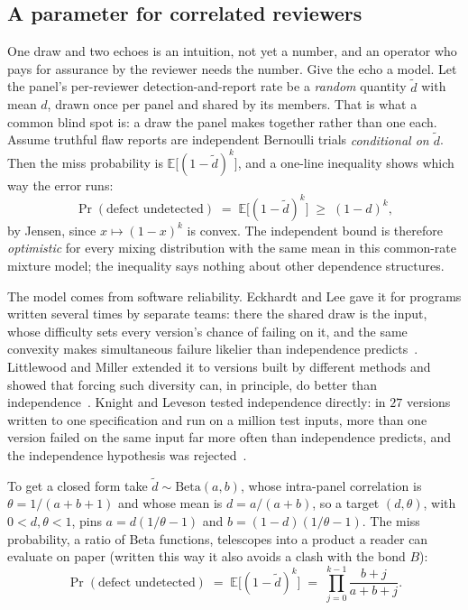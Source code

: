 \documentclass[11pt,a4paper]{article}
\theoremstyle{definition}
\theoremstyle{definition}
\theoremstyle{remark}
\begin{document}
\subsection{A parameter for correlated reviewers}\label{sec:assurance-correlation}

One draw and two echoes is an intuition, not yet a number, and an operator who
pays for assurance by the reviewer needs the number. Give the echo a
model. Let the panel's per-reviewer detection-and-report rate be a \emph{random} quantity $\tilde d$
with mean $d$, drawn once per panel and shared by its members. That is what a
common blind spot is: a draw the panel makes together rather than one each.
Assume truthful flaw reports are independent Bernoulli trials \emph{conditional on $\tilde d$}. Then
the miss probability is $\mathbb{E}\bigl[(1-\tilde d)^k\bigr]$, and a one-line
inequality shows which way the error runs:
\begin{equation}\label{eq:assurance-jensen}
\Pr(\text{defect undetected}) \;=\; \mathbb{E}\bigl[(1-\tilde d)^k\bigr] \;\ge\; (1-d)^k ,
\end{equation}
by Jensen, since $x \mapsto (1-x)^k$ is convex. The independent bound is
therefore \emph{optimistic} for every mixing distribution with the same mean in
this common-rate mixture model; the inequality says nothing about other
dependence structures.

The model comes from software reliability. Eckhardt and Lee gave it for
programs written several times by separate teams: there the shared draw is
the input, whose difficulty sets every version's chance of failing on it, and
the same convexity makes simultaneous failure likelier than independence
predicts~. Littlewood and Miller extended it to versions
built by different methods and showed that forcing such diversity can, in
principle, do better than independence~. Knight and
Leveson tested independence directly: in $27$ versions written to one
specification and run on a million test inputs, more than one version failed
on the same input far more often than independence predicts, and the
independence hypothesis was rejected~.

To get a closed form take $\tilde d \sim \mathrm{Beta}(a,b)$, whose intra-panel
correlation is $\theta = 1/(a+b+1)$ and whose mean is $d = a/(a+b)$, so a target
$(d,\theta)$, with $0<d,\theta<1$, pins
$a = d(1/\theta - 1)$ and $b = (1-d)(1/\theta - 1)$. The
miss probability, a ratio of Beta functions, telescopes into a product a
reader can evaluate on paper (written this way it also avoids a clash with
the bond $B$):
\begin{equation}\label{eq:assurance-beta}
\Pr(\text{defect undetected})
  \;=\; \mathbb{E}\bigl[(1-\tilde d)^k\bigr]
  \;=\; \prod_{j=0}^{k-1}\frac{b+j}{a+b+j}.
\end{equation}
\end{document}
